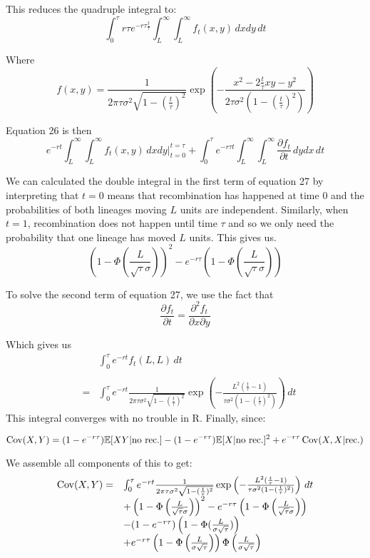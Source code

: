 \documentclass[12pt]{article}
\def\Cov{\mathop{\rm Cov}}
\begin{document}
This reduces the quadruple integral to:
\begin{equation}
\int_0^\tau r\tau e^{-r\tau \frac{t}{\tau}}\int_{L}^\infty \int_L^\infty f_t(x,y) \,dxdy \,dt
\end{equation}

Where 
$$
f(x,y)= \frac{1}{2\pi\tau\sigma^2\sqrt{1-(\frac{t}{\tau})^2}}\exp\left(-\frac{x^2-2\frac{t}{\tau}xy-y^2}{2\tau\sigma^2(1-(\frac{t}{\tau})^2)}\right)$$

Equation 26 is then
\begin{equation}
 e^{-r t}\int_L^\infty\int_L^\infty f_t(x,y)\,dxdy|_{t=0}^{t=\tau} + \int_0^\tau e^{-r\tau t}\int_L^\infty\int_L^\infty\frac{\partial f_t}{\partial t} \,dydx \,dt
 \end{equation}

We can calculated the double integral in the first term of equation 27 by interpreting that $t=0$ means that recombination has happened at time $0$ and the probabilities of  both lineages moving $L$ units are independent. Similarly, when $t=1$, recombination does not happen until time $\tau$ and so we only need the probability that one lineage has moved $L$ units. This gives us.
\begin{equation}
\left(1-\Phi\left(\frac{L}{\sqrt{\tau}\sigma}\right)\right)^2 - e^{-r\tau}\left(1-\Phi\left( \frac{L}{\sqrt{\tau}\sigma}\right)\right)
\end{equation}



To solve the second term of equation 27, we use the fact that 
$$\frac{\partial f_t}{\partial t} = \frac{\partial^2f_t}{\partial x \partial y}$$

Which gives us 
\[\begin{array}{rcl}
&&\int_0^\tau e^{-rt}f_t(L,L) \,dt\\
&&\\
&=& \int_0^\tau e^{-rt}\frac{1}{2\pi\tau\sigma^2\sqrt{1-(\frac{t}{\tau})^2}}\exp\left(-\frac{L^2(\frac{t}{\tau}-1)}{\tau\sigma^2(1-(\frac{t}{\tau})^2)}\right) \,dt
\end{array}\]
This integral converges with no trouble in R. Finally, since:

$$\Cov(X,Y) = (1-e^{-r\tau})\mathbb{E}[XY|\textrm{no rec.}] - (1-e^{-r\tau})\mathbb{E}[X| \textrm{no rec.}]^2 + e^{-r\tau}\Cov(X,X|\textrm{rec.})$$

We assemble all components of this to get:
\[\begin{array}{rl}
\Cov(X,Y)  = &  \int_0^\tau e^{-rt}\frac{1}{2\pi\tau\sigma^2\sqrt{1-(\frac{t}{\tau})^2}}\exp\left(-\frac{L^2(\frac{t}{\tau}-1)}{\tau\sigma^2(1-(\frac{t}{\tau})^2)}\right) \,dt \\
& + \left(1-\Phi\left(\frac{L}{\sqrt{\tau}\sigma}\right)\right)^2 - e^{-r\tau}\left(1-\Phi\left( \frac{L}{\sqrt{\tau}\sigma}\right)\right)\\
& - (1-e^{-r\tau})\left( 1 - \Phi(\frac{L}{\sigma\sqrt{\tau}})\right)\\
& + e^{-r\tau}\left( 1 - \Phi\left(\frac{L}{\sigma\sqrt{\tau}}\right)\right)\Phi\left(\frac{L}{\sigma\sqrt{\tau}}\right)
\end{array}\]
\end{document}
